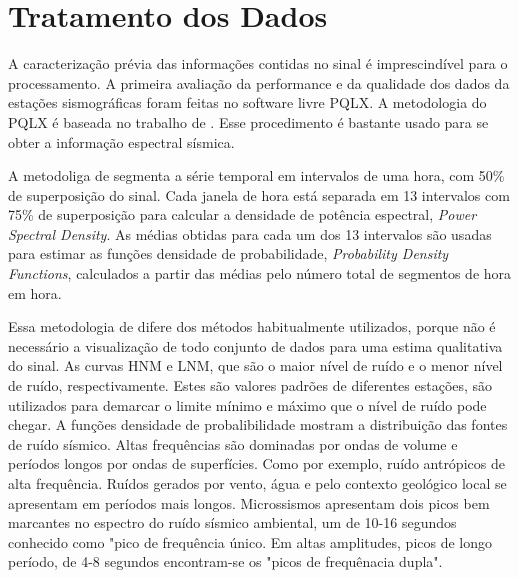 \section{Tratamento dos Dados}

A caracterização prévia das informações contidas no sinal é imprescindível para o processamento. A primeira avaliação da performance e da qualidade dos dados da estações sismográficas foram feitas no software livre PQLX.  A metodologia do PQLX é baseada no trabalho de \cite{McNamara_Buland_2004}. Esse procedimento é bastante usado para se obter a informação espectral sísmica.

A metodoliga de \cite{McNamara_Buland_2004} segmenta a série temporal em intervalos de uma hora, com 50\% de superposição do sinal. Cada janela de hora está separada em 13 intervalos com 75\% de superposição para calcular a densidade de potência espectral, \textit{Power Spectral Density}. As médias obtidas para cada um dos 13 intervalos são usadas para estimar as funções densidade de probabilidade, \textit{Probability Density Functions}, calculados a partir das médias pelo número total de segmentos de hora em hora. 

Essa metodologia de \cite{McNamara_Buland_2004} difere dos métodos habitualmente utilizados, porque não é necessário a visualização de todo conjunto de dados para uma estima qualitativa do sinal.  As curvas HNM e LNM, que são o maior nível de ruído  e o menor nível de ruído, respectivamente. Estes são valores padrões de diferentes estações, são utilizados para demarcar o limite mínimo e máximo que o nível de ruído pode chegar. A funções densidade de probalibilidade mostram a distribuição das fontes de ruído sísmico. Altas frequências são dominadas por ondas de volume e períodos longos por ondas de superfícies. Como por exemplo, ruído antrópicos de alta frequência. Ruídos gerados por vento, água e pelo contexto geológico local se apresentam em períodos mais longos. Microssismos apresentam dois picos bem marcantes no espectro do ruído sísmico ambiental, um de 10-16 segundos conhecido como "pico de frequência único. Em altas amplitudes, picos de longo período, de 4-8 segundos encontram-se os "picos de frequênacia dupla".

